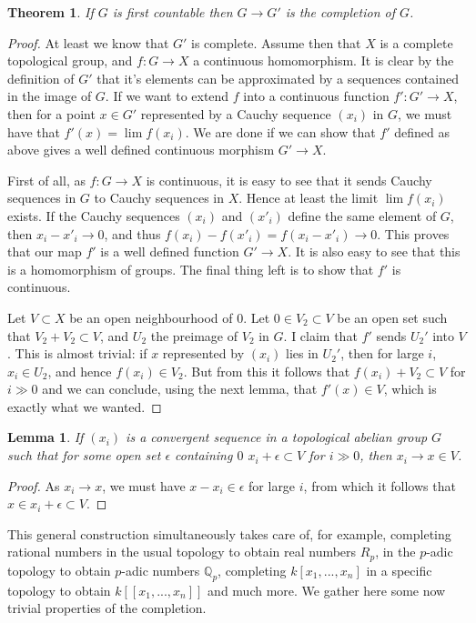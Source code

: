\documentclass[12pt,a4paper,leqno]{article}
\newcommand{\Q}{\mathbb{Q}}
\theoremstyle{plain}
\newtheorem{thm}[theo]{Theorem}
\newtheorem{lem}[theo]{Lemma}
\theoremstyle{definition}
\theoremstyle{remark}
\begin{document}
\begin{thm}
If $G$ is first countable then $G \to G'$ is the completion of $G$.
\end{thm}
\begin{proof}
At least we know that $G'$ is complete. Assume then that $X$ is a complete topological group, and $f: G \to X$ a continuous homomorphism. It is clear by the definition of $G'$ that it's elements can be approximated by a sequences contained in the image of $G$. If we want to extend $f$ into a continuous function $f' : G' \to X$, then for a point $x \in G'$ represented by a Cauchy sequence $(x_i)$ in $G$, we must have that $f' (x) = \lim f(x_i)$. We are done if we can show that $f'$ defined as above gives a well defined continuous morphism $G' \to X$.

First of all, as $f: G \to X$ is continuous, it is easy to see that it sends Cauchy sequences in $G$ to Cauchy sequences in $X$. Hence at least the limit $\lim f(x_i)$ exists. If the Cauchy sequences $(x_i)$ and $(x'_i)$ define the same element of $G$, then $x_i - x'_i \to 0$, and thus $f(x_i) - f(x'_i) = f(x_i - x'_i) \to 0$. This proves that our map $f'$ is a well defined function $G' \to X$. It is also easy to see that this is a homomorphism of groups. The final thing left is to show that $f'$ is continuous.

Let $V \subset X$ be an open neighbourhood of $0$. Let $0 \in V_2 \subset V$ be an open set such that $V_2 + V_2 \subset V$, and $U_2$ the preimage of $V_2$ in $G$. I claim that $f'$ sends $U_2'$ into $V$. This is almost trivial: if $x$ represented by $(x_i)$ lies in $U_2'$, then for large $i$, $x_i \in U_2$, and hence $f(x_i) \in V_2$. But from this it follows that $f(x_i) + V_2 \subset V$ for $i \gg 0$ and we can conclude, using the next lemma, that $f'(x) \in V$, which is exactly what we wanted. 
\end{proof}

\begin{lem}
If $(x_i)$ is a convergent sequence in a topological abelian group $G$ such that for some open set $\epsilon$ containing $0$ $x_i + \epsilon \subset V$ for $i \gg 0$, then $x_i \to x \in V$.
\end{lem}
\begin{proof}
As $x_i \to x$, we must have $x - x_i \in \epsilon$ for large $i$, from which it follows that $x \in x_i + \epsilon \subset V$.
\end{proof}

This general construction simultaneously takes care of, for example, completing rational numbers in the usual topology to obtain real numbers $R_p$, in the $p$-adic topology to obtain $p$-adic numbers $\Q_p$, completing $k[x_1,...,x_n]$ in a specific topology to obtain $k[[x_1,...,x_n]]$ and much more. We gather here some now trivial properties of the completion.
\end{document}

